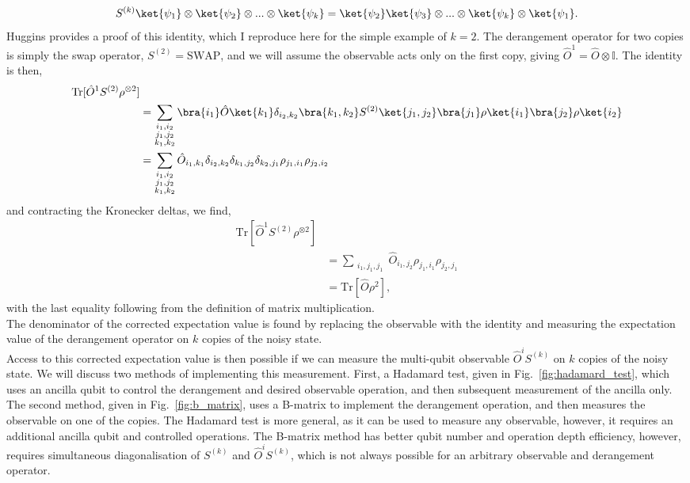 \begin{equation}
    S^{(k)}\ket{\psi_1}\otimes\ket{\psi_2}\otimes...\otimes\ket{\psi_k}=\ket{\psi_2}\ket{\psi_3}\otimes...\otimes\ket{\psi_k}\otimes\ket{\psi_1}.
\end{equation}
Huggins provides a proof of this identity, which I reproduce here for the simple example of $k=2$.   The derangement operator for two copies is simply the swap operator, $S^{(2)}=\mathrm{SWAP}$, and we will assume the observable acts only on the first copy, giving $\hat{O}^1 = \hat{O}\otimes\mathbb{I}$. The identity is then,
\begin{align}
    \mathrm{Tr}[\hat{O}^1S^{(2)}\rho^{\otimes 2}]&\\
    &= \sum_{\substack{i_1,i_2\\j_1,j_2\\k_1,k_2}} \bra{i_1}\hat{O}\ket{k_1}\delta_{i_2,k_2}
    \bra{k_1, k_2}S^{(2)}\ket{j_1,j_2}\bra{j_1}\rho\ket{i_1}\bra{j_2}\rho\ket{i_2}\\
    &= \sum_{\substack{i_1,i_2\\j_1,j_2\\k_1, k_2}} \hat{O}_{i_1, k_1}\delta_{i_2,k_2}\delta_{k_1,j_2}\delta_{k_2,j_1}\rho_{j_1,i_1}\rho_{j_2,i_2}
\end{align}
and contracting the Kronecker deltas, we find,
\begin{align}
    \mathrm{Tr}[\hat{O}^1S^{(2)}\rho^{\otimes 2}]&\\
    &= \sum_{\substack{i_1,j_1, j_1}} \hat{O}_{i_1, j_2}\rho_{j_1,i_1}\rho_{j_2,j_1}\\
    &= \mathrm{Tr}[\hat{O}\rho^2],
\end{align}
with the last equality following from the definition of matrix multiplication. \\
The denominator of the corrected expectation value is found by replacing the observable with the identity and measuring the expectation value of the derangement operator on $k$ copies of the noisy state.\\
Access to this corrected expectation value is then possible if we can measure the multi-qubit observable $\hat{O}^iS^{(k)}$ on $k$ copies of the noisy state. We will discuss two methods of implementing this measurement. First, a Hadamard test, given in Fig.~\ref{fig:hadamard_test}, which uses an ancilla qubit to control the derangement and desired observable operation, and then subsequent measurement of the ancilla only. The second method, given in Fig.~\ref{fig:b_matrix}, uses a B-matrix to implement the derangement operation, and then measures the observable on one of the copies. 
The Hadamard test is more general, as it can be used to measure any observable, however, it requires an additional ancilla qubit and controlled operations. The B-matrix method has better qubit number and operation depth efficiency, however, requires simultaneous diagonalisation of $S^{(k)}$ and $\hat{O}^iS^{(k)}$, which is not always possible for an arbitrary observable and derangement operator.

